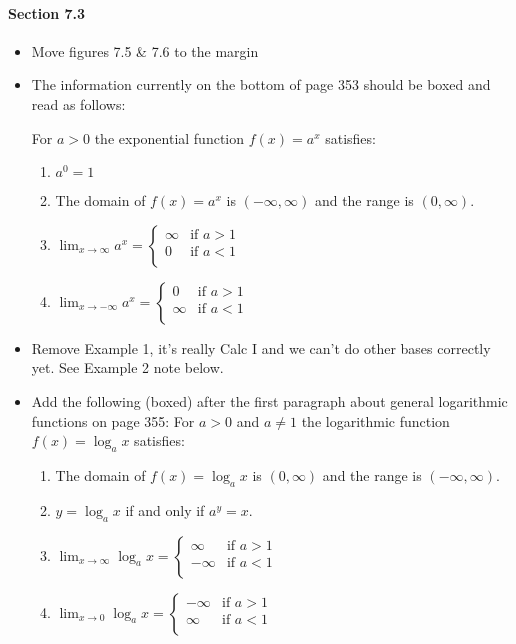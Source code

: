 \documentclass[12pt]{report}
\begin{document}
\begin{itemize}
{}

\end{itemize}

\paragraph{Section 7.3}

\begin{itemize}

\item Move figures 7.5 \& 7.6 to the margin
\item The information currently on the bottom of page 353 should be boxed and read as follows: \par
For $a>0$ the exponential function $f(x)=a^x$ satisfies:
\begin{enumerate}
\item $a^0=1$
\item The domain of $f(x)=a^x$  is $(-\infty,\infty)$ and the range is $(0,\infty)$.
\item $\displaystyle\lim_{x\to\infty} a^x=\begin{cases} \infty & \text{if $a>1$}\\ 0 & \text{if $a<1$}\\ \end{cases}$
\item $\displaystyle\lim_{x\to-\infty} a^x= \begin{cases} 0 & \text{if $a>1$}\\ \infty & \text{if $a<1$}\\ \end{cases}$
\end{enumerate}

\item Remove Example 1, it's really Calc I and we can't do other bases correctly yet. See Example 2 note below.

\item Add the following (boxed) after the first paragraph about general logarithmic functions on page 355:
For $a>0$ and $a\neq 1$ the logarithmic function $f(x)=\log_ax$ satisfies:
\begin{enumerate}
\item The domain of $f(x)=\log_a x$ is $(0,\infty)$ and the range is $(-\infty,\infty)$.
\item $y=\log_ax$ if and only if $a^y=x$.
\item $\displaystyle\lim_{x\to\infty} \log_ax= \begin{cases} \infty & \text{if $a>1$}\\ -\infty & \text{if $a<1$}\\ \end{cases}$
\item $\displaystyle\lim_{x\to0} \log_ax= \begin{cases} -\infty & \text{if $a>1$}\\ \infty & \text{if $a<1$}\\ \end{cases}$
\end{enumerate}


\end{itemize}
\end{document}
